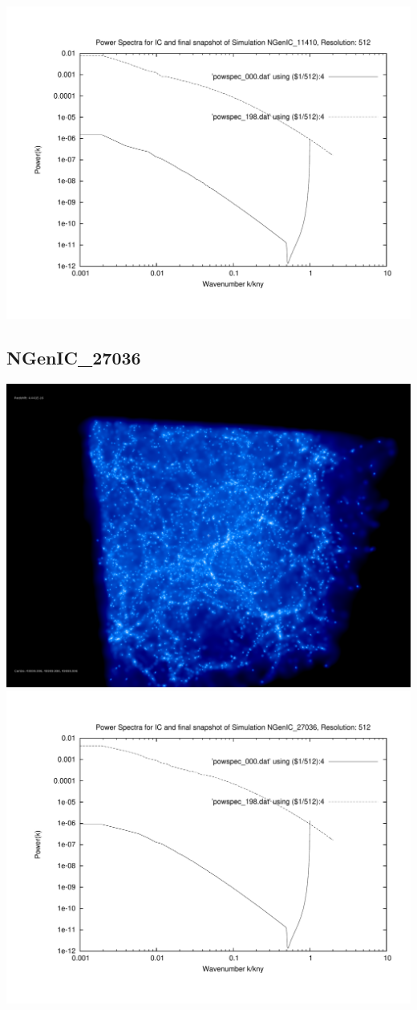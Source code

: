 \includegraphics[scale=0.5]{r512/NGenIC_11410/plot_powspec_NGenIC_11410.pdf} 
% 
%
%
%
%
%
%
%

\newpage
\subsection{NGenIC\_27036}  

\includegraphics[scale=0.2]{r512/NGenIC_27036/screenshot_snapshot_200.png} \\

\includegraphics[scale=0.5]{r512/NGenIC_27036/plot_powspec_NGenIC_27036.pdf}


% 
%
%
%
%
%
%
%

